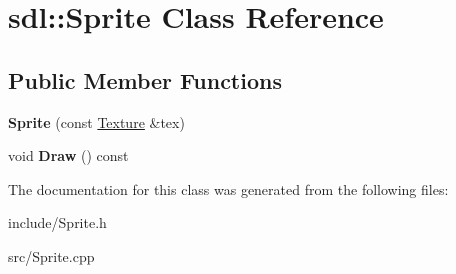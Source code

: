 \hypertarget{classsdl_1_1Sprite}{\section{sdl\-:\-:Sprite Class Reference}
\label{classsdl_1_1Sprite}
}
\subsection*{Public Member Functions}
\begin{DoxyCompactItemize}
\item 
\hypertarget{classsdl_1_1Sprite_af75e3f2937ead5f87c59ac7ece35f0b5}{{\bfseries Sprite} (const \hyperlink{classsdl_1_1Texture}{Texture} \&tex)}\label{classsdl_1_1Sprite_af75e3f2937ead5f87c59ac7ece35f0b5}

\item 
\hypertarget{classsdl_1_1Sprite_ad6f9c96866b860e575949f64ca71e3bc}{void {\bfseries Draw} () const }\label{classsdl_1_1Sprite_ad6f9c96866b860e575949f64ca71e3bc}

\end{DoxyCompactItemize}


The documentation for this class was generated from the following files\-:\begin{DoxyCompactItemize}
\item 
include/Sprite.\-h\item 
src/Sprite.\-cpp\end{DoxyCompactItemize}
